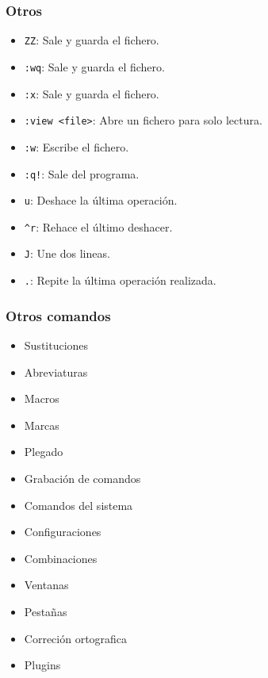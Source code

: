 \documentclass[10pt]{beamer}
\begin{document}
  \begin{frame}[containsverbatim]
    \frametitle{Otros}
    \begin{itemize}
      \item \verb+ZZ+: Sale y guarda el fichero.
      \item \verb+:wq+: Sale y guarda el fichero.
      \item \verb+:x+: Sale y guarda el fichero.
      \item \verb+:view <file>+: Abre un fichero para solo lectura.
      \item \verb+:w+: Escribe el fichero.
      \item \verb+:q!+: Sale del programa.
      \item \verb+u+: Deshace la última operación.
      \item \verb+^r+: Rehace el último deshacer.
      \item \verb+J+: Une dos lineas.
      \item \verb+.+: Repite la última operación realizada.
    \end{itemize}
  \end{frame}

  
  \begin{frame}
    \frametitle{Otros comandos}
    \begin{itemize}
      \item Sustituciones
      \item Abreviaturas
      \item Macros
      \item Marcas
      \item Plegado
      \item Grabación de comandos
      \item Comandos del sistema
      \item Configuraciones
      \item Combinaciones
      \item Ventanas
      \item Pestañas
      \item Correción ortografica
      \item Plugins
    \end{itemize}
  \end{frame}
  
\end{document}
